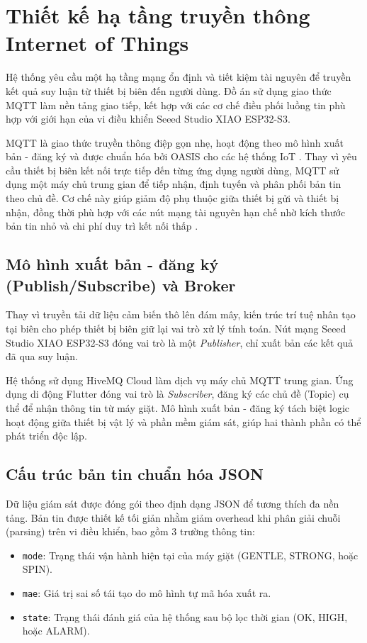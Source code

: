 
\section{Thiết kế hạ tầng truyền thông Internet of Things}

Hệ thống yêu cầu một hạ tầng mạng ổn định và tiết kiệm tài nguyên để truyền kết quả suy luận từ thiết bị biên đến người dùng. Đồ án sử dụng giao thức MQTT làm nền tảng giao tiếp, kết hợp với các cơ chế điều phối luồng tin phù hợp với giới hạn của vi điều khiển Seeed Studio XIAO ESP32-S3.

MQTT là giao thức truyền thông điệp gọn nhẹ, hoạt động theo mô hình xuất bản - đăng ký và được chuẩn hóa bởi OASIS cho các hệ thống IoT . Thay vì yêu cầu thiết bị biên kết nối trực tiếp đến từng ứng dụng người dùng, MQTT sử dụng một máy chủ trung gian để tiếp nhận, định tuyến và phân phối bản tin theo chủ đề. Cơ chế này giúp giảm độ phụ thuộc giữa thiết bị gửi và thiết bị nhận, đồng thời phù hợp với các nút mạng tài nguyên hạn chế nhờ kích thước bản tin nhỏ và chi phí duy trì kết nối thấp .

\subsection{Mô hình xuất bản - đăng ký (Publish/Subscribe) và Broker}
Thay vì truyền tải dữ liệu cảm biến thô lên đám mây, kiến trúc trí tuệ nhân tạo tại biên cho phép thiết bị biên giữ lại vai trò xử lý tính toán. Nút mạng Seeed Studio XIAO ESP32-S3 đóng vai trò là một \textit{Publisher}, chỉ xuất bản các kết quả đã qua suy luận.

Hệ thống sử dụng HiveMQ Cloud làm dịch vụ máy chủ MQTT trung gian. Ứng dụng di động Flutter đóng vai trò là \textit{Subscriber}, đăng ký các chủ đề (Topic) cụ thể để nhận thông tin từ máy giặt. Mô hình xuất bản - đăng ký tách biệt logic hoạt động giữa thiết bị vật lý và phần mềm giám sát, giúp hai thành phần có thể phát triển độc lập.

\subsection{Cấu trúc bản tin chuẩn hóa JSON}
Dữ liệu giám sát được đóng gói theo định dạng JSON để tương thích đa nền tảng. Bản tin được thiết kế tối giản nhằm giảm overhead khi phân giải chuỗi (parsing) trên vi điều khiển, bao gồm 3 trường thông tin:
\begin{itemize}
    \item \texttt{mode}: Trạng thái vận hành hiện tại của máy giặt (GENTLE, STRONG, hoặc SPIN).
    \item \texttt{mae}: Giá trị sai số tái tạo do mô hình tự mã hóa xuất ra.
    \item \texttt{state}: Trạng thái đánh giá của hệ thống sau bộ lọc thời gian (OK, HIGH, hoặc ALARM).
\end{itemize}

